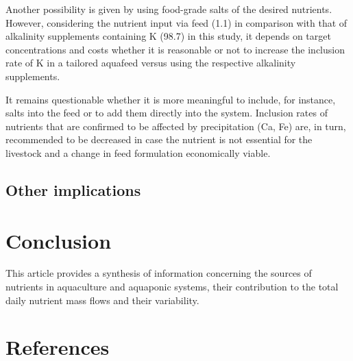 \documentclass[preprint, 3p,
authoryear]{elsarticle} %
\begin{document}
Another possibility is given by using food-grade salts of the desired
nutrients. However, considering the nutrient input via feed
(\SI{1.1}{\p}) in comparison with that of alkalinity supplements
containing K (\SI{98.7}{\p}) in this study, it depends on target
concentrations and costs whether it is reasonable or not to increase the
inclusion rate of K in a tailored aquafeed versus using the respective
alkalinity supplements.

It remains questionable whether it is more meaningful to include, for
instance, salts into the feed or to add them directly into the system.
Inclusion rates of nutrients that are confirmed to be affected by
precipitation (Ca, Fe) are, in turn, recommended to be decreased in case
the nutrient is not essential for the livestock and a change in feed
formulation economically viable.

\hypertarget{other-implications}{%
\subsection{Other implications}\label{other-implications}}

\hypertarget{conclusion}{%
\section{Conclusion}\label{conclusion}}

This article provides a synthesis of information concerning the sources
of nutrients in aquaculture and aquaponic systems, their contribution to
the total daily nutrient mass flows and their variability.

\hypertarget{references}{%
\section*{References}\label{references}}
\end{document}
